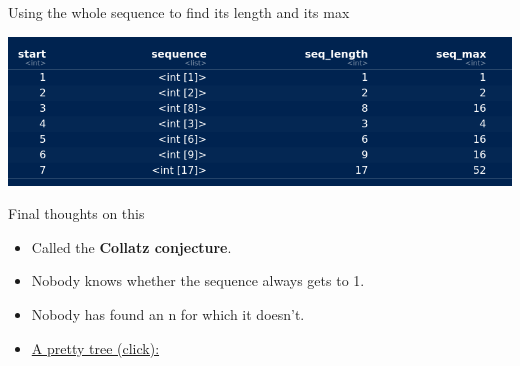 \documentclass[
  ignorenonframetext,
]{beamer}
\newenvironment{Shaded}{\begin{snugshade}}{\end{snugshade}}
\newcommand{\DataTypeTok}[1]{\textcolor[rgb]{0.13,0.29,0.53}{#1}}
\newcommand{\DecValTok}[1]{\textcolor[rgb]{0.00,0.00,0.81}{#1}}
\newcommand{\KeywordTok}[1]{\textcolor[rgb]{0.13,0.29,0.53}{\textbf{#1}}}
\newcommand{\NormalTok}[1]{#1}
\newcommand{\OperatorTok}[1]{\textcolor[rgb]{0.81,0.36,0.00}{\textbf{#1}}}
\newcommand{\StringTok}[1]{\textcolor[rgb]{0.31,0.60,0.02}{#1}}
\providecommand{\tightlist}{%
  \setlength{\itemsep}{0pt}\setlength{\parskip}{0pt}}
\begin{document}
\begin{frame}[fragile]{Using the whole sequence to find its length and
its max}
\protect\hypertarget{using-the-whole-sequence-to-find-its-length-and-its-max}{}

\begin{Shaded}
\end{Shaded}

\includegraphics{Screenshot_2019-05-07_13-47-08.png}

\end{frame}

\begin{frame}{Final thoughts on this}
\protect\hypertarget{final-thoughts-on-this}{}

\begin{itemize}
\tightlist
\item
  Called the \textbf{Collatz conjecture}.
\item
  Nobody knows whether the sequence always gets to 1.
\item
  Nobody has found an n for which it doesn't.
\item
  \href{https://en.wikipedia.org/wiki/Collatz_conjecture\#/media/File:Collatz-graph-all-30-no27.svg}{A
  pretty tree (click):}
\end{itemize}

\end{frame}
\end{document}
